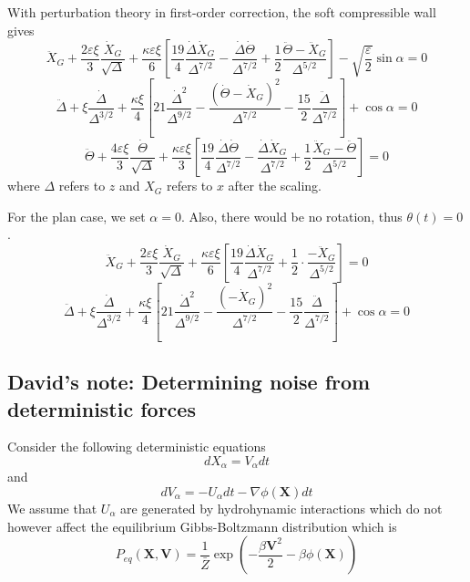 \documentclass[books,12pt]{elegantpaper}
\newcommand{\ssc}{\subsection}
\newcommand{\beq}{\begin{equation}}
\newcommand{\eeq}{\end{equation}}
\newcommand{\tlag}[1]{\tag{#1} \label{#1}}
\newcommand{\veps}{\varepsilon}
\begin{document}
With perturbation theory in first-order correction, the soft compressible wall gives 
\beq \ddot{X}_G + \frac{2\varepsilon \xi}{3} \frac{\dot{X}_G}{\sqrt\Delta} + \frac{\kappa \varepsilon \xi}{6} \left[ \frac{19}{4} \frac{\dot\Delta \dot{X}_G}{\Delta^{7/2}} - \frac{\dot\Delta \dot\Theta}{\Delta^{7/2}} + \frac{1}{2} \frac{\ddot\Theta - \ddot{X}_G}{\Delta^{5/2}} \right] - \sqrt{\frac{\varepsilon}{2}} \sin\alpha = 0 \tlag{Salez2015.50} \eeq
\beq \ddot{\Delta} + \xi \frac{\dot{\Delta}}{\Delta^{3/2}} + \frac{\kappa\xi}{4} \left[ 21 \frac{\dot{\Delta}^2}{\Delta^{9/2}} - \frac{(\dot\Theta - \dot{X}_G)^2}{\Delta^{7/2}} - \frac{15}{2} \frac{\ddot\Delta}{\Delta^{7/2}} \right] + \cos\alpha = 0  \tlag{Salez2015.51} \eeq
\beq \ddot{\Theta} + \frac{4\veps\xi}{3} \frac{\dot\Theta}{\sqrt\Delta} + \frac{\kappa \veps \xi}{3} \left[ \frac{19}{4} \frac{\dot\Delta \dot\Theta}{\Delta^{7/2}} - \frac{\dot\Delta \dot{X}_G}{\Delta^{7/2}} + \frac{1}{2} \frac{\ddot{X}_G - \ddot\Theta}{\Delta^{5/2}} \right] = 0 \tlag{Salez2015.52} \eeq
where $\Delta$ refers to $z$ and $X_G$ refers to $x$ after the scaling.

For the plan case, we set $\alpha=0$. Also, there would be no rotation, thus $\theta(t)=0$.
$$ \ddot{X}_G + \frac{2\varepsilon \xi}{3} \frac{\dot{X}_G}{\sqrt\Delta} + \frac{\kappa \varepsilon \xi}{6} \left[ \frac{19}{4} \frac{\dot\Delta \dot{X}_G}{\Delta^{7/2}} + \frac{1}{2} \cdot \frac{ - \ddot{X}_G}{\Delta^{5/2}} \right] = 0 $$
$$ \ddot{\Delta} + \xi \frac{\dot{\Delta}}{\Delta^{3/2}} + \frac{\kappa\xi}{4} \left[ 21 \frac{\dot{\Delta}^2}{\Delta^{9/2}} - \frac{( - \dot{X}_G)^2}{\Delta^{7/2}} - \frac{15}{2} \frac{\ddot\Delta}{\Delta^{7/2}} \right] + \cos\alpha = 0  $$



\ssc{David's note: Determining noise from deterministic forces}
Consider the following deterministic equations
\beq dX_\alpha = V_\alpha dt \tag{David.1} \label{David.1} \eeq
and
\beq dV_\alpha = -U_\alpha dt - \nabla \phi(\mathbf{X}) dt \tlag{David.2} \eeq 
We assume that $U_\alpha$ are generated by hydrohynamic interactions which do not however affect the equilibrium Gibbs-Boltzmann distribution which is 
\beq P_{eq} (\mathbf{X},\mathbf{V}) = \frac{1}{\bar{Z}} \exp \left( - \frac{\beta \mathbf{V}^2}{2} - \beta \phi(\mathbf{X}) \right) \tlag{David.3} \eeq
\end{document}
